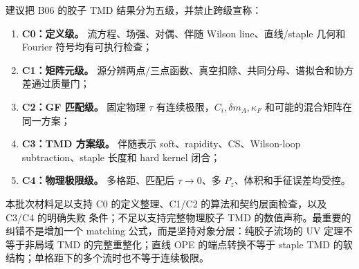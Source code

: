 建议把 B06 的胶子 TMD 结果分为五级，并禁止跨级宣称：
\begin{enumerate}
  \item \textbf{C0：定义级。} 流方程、场强、对偶、伴随 Wilson line、直线/staple 几何和 Fourier 符号均有可执行检查；
  \item \textbf{C1：矩阵元级。} 源分辨两点/三点函数、真空扣除、共同分母、谱拟合和协方差通过质量门；
  \item \textbf{C2：GF 匹配级。} 固定物理 \(\tau\) 有连续极限，\(C_i,\delta m_A,\kappa_F\) 和可能的混合矩阵在同一方案；
  \item \textbf{C3：TMD 方案级。} 伴随表示 soft、rapidity、CS、Wilson-loop subtraction、staple 长度和 hard kernel 闭合；
  \item \textbf{C4：物理极限级。} 多格距、匹配后 \(\tau\to0\)、多 \(P_z\)、体积和手征误差均受控。
\end{enumerate}

本批次材料足以支持 C0 的定义整理、C1/C2 的算法和契约层面检查，以及 C3/C4 的明确失败
条件；不足以支持完整物理胶子 TMD 的数值声称。最重要的纠错不是增加一个 matching
公式，而是坚持对象分层：纯胶子流场的 UV 定理不等于非局域 TMD 的完整重整化；直线
OPE 的端点转换不等于 staple TMD 的软结构；单格距下的多个流时也不等于连续极限。
